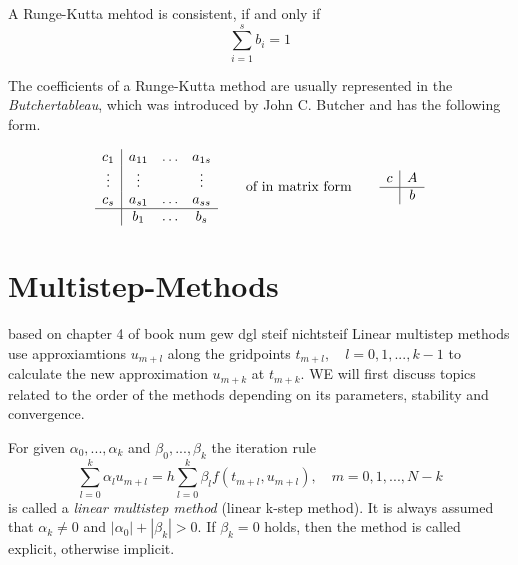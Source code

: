 		\begin{lemma}%
			A Runge-Kutta mehtod is consistent, if and only if
			\begin{displaymath}
				\sum_{i=1}^{s} b_i = 1
			\end{displaymath}
		\end{lemma}
		
		The coefficients of a Runge-Kutta method are usually represented in the \emph{Butchertableau}, which was introduced by John C. Butcher and has the following form.
		
		\begin{displaymath}
			\begin{array}{c|ccc}
				c_1 & a_{11} & \dots & a_{1s} \\
				\vdots & \vdots & & \vdots \\
				c_s & a_{s1} & \dots & a_{ss} \\
				\hline
				 & b_1 & \dots & b_s
			\end{array}
			\qquad
			\text{of in matrix form}
			\qquad
			\begin{array}{c|c}
				c & A \\
				\hline
				 & b
			\end{array}
		\end{displaymath}
		
\section{Multistep-Methods}
	based on chapter 4 of book num gew dgl steif nichtsteif \newline
	Linear multistep methods use approxiamtions $u_{m+l}$ along the gridpoints $t_{m+l}, \quad l=0,1,...,k-1$ to calculate the new approximation $u_{m+k}$ at $t_{m+k}$. WE will first discuss topics related to the order of the methods depending on its parameters, stability and convergence.
	
	\begin{definition}
		For given $\alpha_0, ..., \alpha_k$ and $\beta_0, ..., \beta_k$ the iteration rule
		\begin{equation}
			\label{linear-multistep-method}
			\sum_{l=0}^{k} \alpha_l u_{m+l} = h \sum_{l=0}^{k} \beta_l f(t_{m+l}, u_{m+l}), \quad m=0,1,...,N-k
		\end{equation}
		is called a \emph{linear multistep method} (linear k-step method). It is always assumed that $\alpha_k \neq 0$ and $|\alpha_0| + |\beta_k| > 0$. If $\beta_k=0$ holds, then the method is called explicit, otherwise implicit.
	\end{definition}
	

